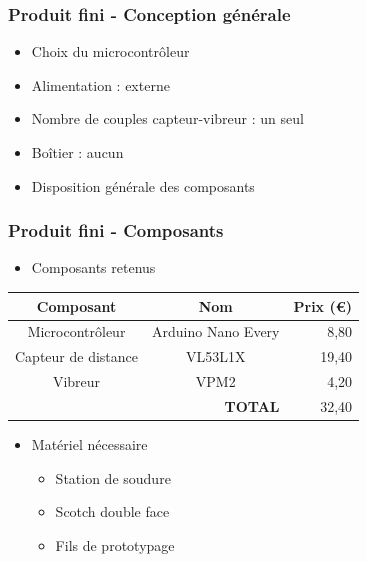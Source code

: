 \documentclass{beamer}
\begin{document}
\begin{frame}
\frametitle{Produit fini - Conception générale}
\begin{itemize}
\item Choix du microcontrôleur
\item Alimentation : externe
\item Nombre de couples capteur-vibreur : un seul
\item Boîtier : aucun
\item Disposition générale des composants
\end{itemize}
\end{frame}



\begin{frame}
\frametitle{Produit fini - Composants}
\begin{itemize}
\item Composants retenus
\end{itemize}
\begin{center}
\begin{tabular}{ccr}
\hline
{\bf Composant} & {\bf Nom} & {\bf Prix (€)} \\
\hline
Microcontrôleur & Arduino Nano Every & 8,80 \\
Capteur de distance & VL53L1X & 19,40 \\
Vibreur & VPM2 & 4,20 \\
\hline
\multicolumn{2}{r}{\bf TOTAL} & 32,40 \\
\hline
\end{tabular}
\end{center}
\begin{itemize}
\item Matériel nécessaire
    \begin{itemize}
    \item Station de soudure
    \item Scotch double face
    \item Fils de prototypage
    \end{itemize}
\end{itemize}
\end{frame}
\end{document}
